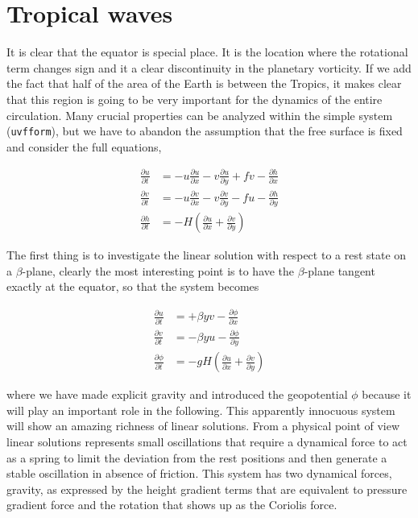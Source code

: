 \section{Tropical waves}\label{TropWaves}

It is clear that the equator is special place. It is the location where
the rotational term changes sign and it a clear discontinuity in the
planetary vorticity. If we add the fact that half of the area of the
Earth is between the Tropics, it makes clear that this region is going
to be very important for the dynamics of the entire circulation. Many
crucial properties can be analyzed within the simple system
(\texttt{uvfform}), but we have to abandon the assumption that the free
surface is fixed and consider the full equations,

\[\begin{aligned}
\frac{\partial u}{\partial t} &= -u \frac{\partial u}{\partial x} -v \frac{\partial u}{\partial y} + f v -\frac{\partial h}{\partial x} \\
\frac{\partial v}{\partial t} &= -u \frac{\partial v}{\partial x} -v \frac{\partial v}{\partial y} - f u -\frac{\partial h}{\partial y} \label{uvtrop}\\
\frac{\partial h}{\partial t}&= -H\left(\frac{\partial u}{\partial x}+\frac{\partial v}{\partial y}\right)
\end{aligned}\]

The first thing is to investigate the linear solution with respect to a
rest state on a \(\beta\)-plane, clearly the most interesting point is
to have the \(\beta\)-plane tangent exactly at the equator, so that the
system becomes

\[\begin{aligned}
\frac{\partial u}{\partial t} &=  + \beta y v -\frac{\partial \phi}{\partial x} \\
\frac{\partial v}{\partial t} &=  - \beta y u -\frac{\partial \phi}{\partial y} \label{lintrop}\\
\frac{\partial \phi}{\partial t}&= -gH\left(\frac{\partial u}{\partial x}+\frac{\partial v}{\partial y}\right)
\end{aligned}\]

where we have made explicit gravity and introduced the geopotential
\(\phi\) because it will play an important role in the following. This
apparently innocuous system will show an amazing richness of linear
solutions. From a physical point of view linear solutions represents
small oscillations that require a dynamical force to act as a spring to
limit the deviation from the rest positions and then generate a stable
oscillation in absence of friction. This system has two dynamical
forces, gravity, as expressed by the height gradient terms that are
equivalent to pressure gradient force and the rotation that shows up as
the Coriolis force.

